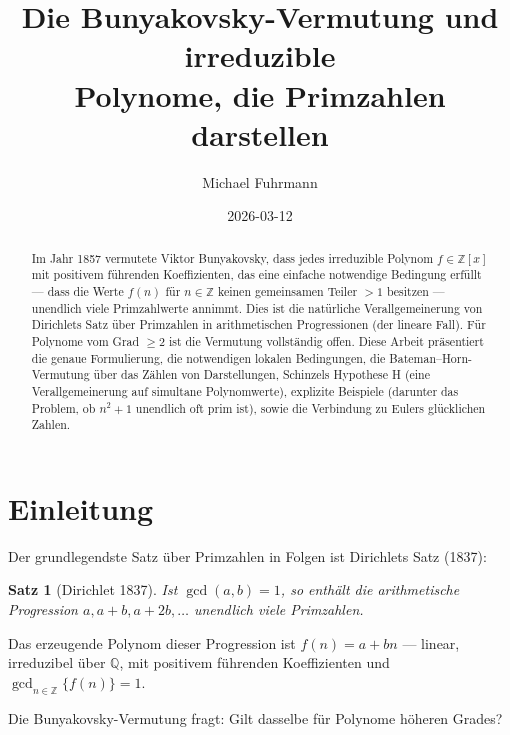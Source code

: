\documentclass[12pt,a4paper]{amsart}
\newtheorem{satz}[theorem]{Satz}
\theoremstyle{definition}
\theoremstyle{remark}
\newcommand{\Z}{\mathbb{Z}}
\newcommand{\Q}{\mathbb{Q}}
\begin{document}
\title{Die Bunyakovsky-Vermutung und irreduzible\\
Polynome, die Primzahlen darstellen}

\author{Michael Fuhrmann}
\address{Specialist Mathematics Project, Build 168}
\date{2026-03-12}

\begin{abstract}
Im Jahr 1857 vermutete Viktor Bunyakovsky, dass jedes irreduzible Polynom
$f \in \Z[x]$ mit positivem führenden Koeffizienten, das eine einfache
notwendige Bedingung erfüllt --- dass die Werte $f(n)$ für $n \in \Z$ keinen
gemeinsamen Teiler $> 1$ besitzen --- unendlich viele Primzahlwerte annimmt.
Dies ist die natürliche Verallgemeinerung von Dirichlets Satz über Primzahlen
in arithmetischen Progressionen (der lineare Fall).
Für Polynome vom Grad $\geq 2$ ist die Vermutung vollständig offen.
Diese Arbeit präsentiert die genaue Formulierung, die notwendigen lokalen
Bedingungen, die Bateman--Horn-Vermutung über das Zählen von Darstellungen,
Schinzels Hypothese H (eine Verallgemeinerung auf simultane Polynomwerte),
explizite Beispiele (darunter das Problem, ob $n^2 + 1$ unendlich oft prim ist),
sowie die Verbindung zu Eulers glücklichen Zahlen.
\end{abstract}

\maketitle

\tableofcontents

\section{Einleitung}

Der grundlegendste Satz über Primzahlen in Folgen ist Dirichlets Satz (1837):

\begin{satz}[Dirichlet 1837]
Ist $\gcd(a, b) = 1$, so enthält die arithmetische Progression
$a, a+b, a+2b, \ldots$ unendlich viele Primzahlen.
\end{satz}

Das erzeugende Polynom dieser Progression ist $f(n) = a + bn$ --- linear,
irreduzibel über $\Q$, mit positivem führenden Koeffizienten und
$\gcd_{n \in \Z}\{f(n)\} = 1$.

Die Bunyakovsky-Vermutung fragt: Gilt dasselbe für Polynome höheren Grades?
\end{document}
